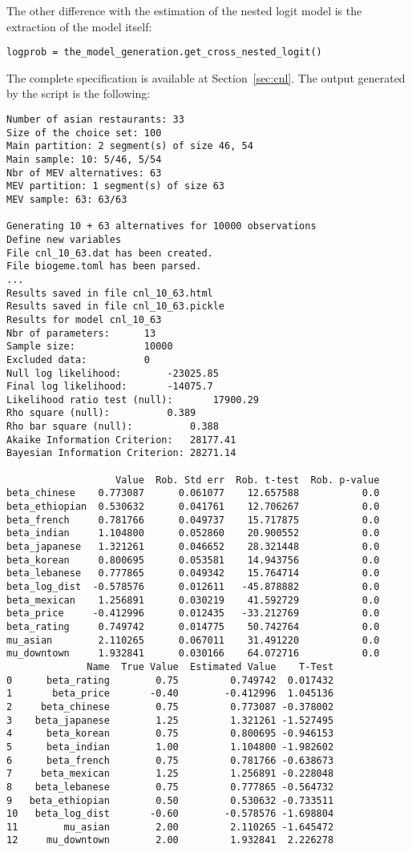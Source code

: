 \documentclass[12pt,a4paper]{article}
\begin{document}
The other difference with the estimation of the nested logit model is the extraction of the model itself:
\begin{lstlisting}
logprob = the_model_generation.get_cross_nested_logit()
\end{lstlisting}
The complete specification is available at Section~\ref{sec:cnl}.
The output generated by the script is the following:
\begin{lstlisting}
Number of asian restaurants: 33
Size of the choice set: 100
Main partition: 2 segment(s) of size 46, 54
Main sample: 10: 5/46, 5/54
Nbr of MEV alternatives: 63
MEV partition: 1 segment(s) of size 63
MEV sample: 63: 63/63

Generating 10 + 63 alternatives for 10000 observations
Define new variables
File cnl_10_63.dat has been created.
File biogeme.toml has been parsed.
...
Results saved in file cnl_10_63.html
Results saved in file cnl_10_63.pickle
Results for model cnl_10_63
Nbr of parameters:		13
Sample size:			10000
Excluded data:			0
Null log likelihood:		-23025.85
Final log likelihood:		-14075.7
Likelihood ratio test (null):		17900.29
Rho square (null):			0.389
Rho bar square (null):			0.388
Akaike Information Criterion:	28177.41
Bayesian Information Criterion:	28271.14

                   Value  Rob. Std err  Rob. t-test  Rob. p-value
beta_chinese    0.773087      0.061077    12.657588           0.0
beta_ethiopian  0.530632      0.041761    12.706267           0.0
beta_french     0.781766      0.049737    15.717875           0.0
beta_indian     1.104800      0.052860    20.900552           0.0
beta_japanese   1.321261      0.046652    28.321448           0.0
beta_korean     0.800695      0.053581    14.943756           0.0
beta_lebanese   0.777865      0.049342    15.764714           0.0
beta_log_dist  -0.578576      0.012611   -45.878882           0.0
beta_mexican    1.256891      0.030219    41.592729           0.0
beta_price     -0.412996      0.012435   -33.212769           0.0
beta_rating     0.749742      0.014775    50.742764           0.0
mu_asian        2.110265      0.067011    31.491220           0.0
mu_downtown     1.932841      0.030166    64.072716           0.0
              Name  True Value  Estimated Value    T-Test
0      beta_rating        0.75         0.749742  0.017432
1       beta_price       -0.40        -0.412996  1.045136
2     beta_chinese        0.75         0.773087 -0.378002
3    beta_japanese        1.25         1.321261 -1.527495
4      beta_korean        0.75         0.800695 -0.946153
5      beta_indian        1.00         1.104800 -1.982602
6      beta_french        0.75         0.781766 -0.638673
7     beta_mexican        1.25         1.256891 -0.228048
8    beta_lebanese        0.75         0.777865 -0.564732
9   beta_ethiopian        0.50         0.530632 -0.733511
10   beta_log_dist       -0.60        -0.578576 -1.698804
11        mu_asian        2.00         2.110265 -1.645472
12     mu_downtown        2.00         1.932841  2.226278
\end{lstlisting}
\clearpage
\end{document}
